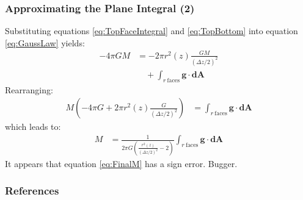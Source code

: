 \documentclass[aspectratio=43,serif,9pt]{beamer}
\newcommand{\vect}[1]{\boldsymbol{#1}}
\begin{document}
\begin{frame}
  \frametitle{Approximating the Plane Integral (2)}
  Substituting equations \eqref{eq:TopFaceIntegral} and  \eqref{eq:TopBottom} into equation \eqref{eq:GaussLaw} yields:
  \begin{align*}
    -4 \pi G M &= -2 \pi r^2(z) \frac{GM}{(\Delta z / 2)^2} \\
               &\quad + \int_{r~\mathrm{faces}} \vect{g} \cdot  \vect{dA}
  \end{align*}
  Rearranging:
  \begin{align*}
    M \left(-4 \pi G +  2 \pi r^2(z) \frac{G}{(\Delta z / 2)^2}
    \right) & = \int_{r~\mathrm{faces}} \vect{g} \cdot  \vect{dA}
  \end{align*}
  which leads to:
  \begin{align}
    M  & =\frac{1}{2 \pi G \left( \frac{r^2(z)}{(\Delta z / 2)^2} -2
    \right)} \int_{r~\mathrm{faces}} \vect{g} \cdot  \vect{dA} \label{eq:FinalM}
  \end{align}
It appears that equation \eqref{eq:FinalM} has a sign error. Bugger.

\end{frame}

\begin{frame}[t,allowframebreaks]
  \frametitle{References}
  \small
  \printbibliography
\end{frame}

 
\end{document}
